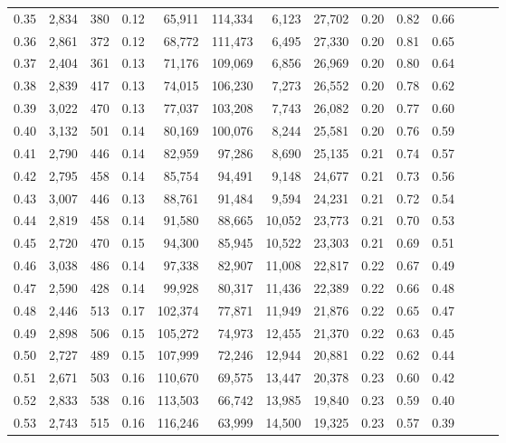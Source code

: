 \begin{tabular}{rrrrrrrrrrrrrr}
0.35 &  2,834 &  380 &  0.12 &   65,911 &  114,334 &   6,123 &  27,702 &  0.20 &  0.82 &      0.66 \\
0.36 &  2,861 &  372 &  0.12 &   68,772 &  111,473 &   6,495 &  27,330 &  0.20 &  0.81 &      0.65 \\
0.37 &  2,404 &  361 &  0.13 &   71,176 &  109,069 &   6,856 &  26,969 &  0.20 &  0.80 &      0.64 \\
0.38 &  2,839 &  417 &  0.13 &   74,015 &  106,230 &   7,273 &  26,552 &  0.20 &  0.78 &      0.62 \\
0.39 &  3,022 &  470 &  0.13 &   77,037 &  103,208 &   7,743 &  26,082 &  0.20 &  0.77 &      0.60 \\
0.40 &  3,132 &  501 &  0.14 &   80,169 &  100,076 &   8,244 &  25,581 &  0.20 &  0.76 &      0.59 \\
0.41 &  2,790 &  446 &  0.14 &   82,959 &   97,286 &   8,690 &  25,135 &  0.21 &  0.74 &      0.57 \\
0.42 &  2,795 &  458 &  0.14 &   85,754 &   94,491 &   9,148 &  24,677 &  0.21 &  0.73 &      0.56 \\
0.43 &  3,007 &  446 &  0.13 &   88,761 &   91,484 &   9,594 &  24,231 &  0.21 &  0.72 &      0.54 \\
0.44 &  2,819 &  458 &  0.14 &   91,580 &   88,665 &  10,052 &  23,773 &  0.21 &  0.70 &      0.53 \\
0.45 &  2,720 &  470 &  0.15 &   94,300 &   85,945 &  10,522 &  23,303 &  0.21 &  0.69 &      0.51 \\
0.46 &  3,038 &  486 &  0.14 &   97,338 &   82,907 &  11,008 &  22,817 &  0.22 &  0.67 &      0.49 \\
0.47 &  2,590 &  428 &  0.14 &   99,928 &   80,317 &  11,436 &  22,389 &  0.22 &  0.66 &      0.48 \\
0.48 &  2,446 &  513 &  0.17 &  102,374 &   77,871 &  11,949 &  21,876 &  0.22 &  0.65 &      0.47 \\
0.49 &  2,898 &  506 &  0.15 &  105,272 &   74,973 &  12,455 &  21,370 &  0.22 &  0.63 &      0.45 \\
0.50 &  2,727 &  489 &  0.15 &  107,999 &   72,246 &  12,944 &  20,881 &  0.22 &  0.62 &      0.44 \\
0.51 &  2,671 &  503 &  0.16 &  110,670 &   69,575 &  13,447 &  20,378 &  0.23 &  0.60 &      0.42 \\
0.52 &  2,833 &  538 &  0.16 &  113,503 &   66,742 &  13,985 &  19,840 &  0.23 &  0.59 &      0.40 \\
0.53 &  2,743 &  515 &  0.16 &  116,246 &   63,999 &  14,500 &  19,325 &  0.23 &  0.57 &      0.39 \\

\end{tabular}
